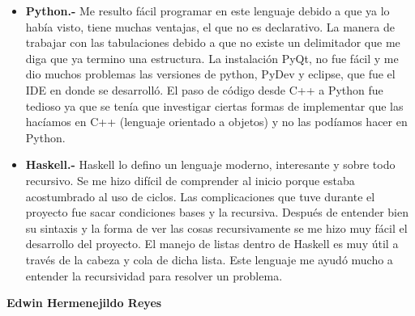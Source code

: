 \documentclass[10pt,oneside]{report}
\begin{document}
\begin{itemize}
	\item {\bf Python.-}  \textsf{ Me resulto fácil programar en este lenguaje debido a que ya lo había visto,  tiene muchas ventajas, el que no es declarativo. La manera de trabajar con las tabulaciones debido a que no existe un delimitador que me diga que ya termino una estructura. La instalación PyQt, no fue fácil y me dio muchos problemas las versiones de python, PyDev y eclipse, que fue el IDE en donde se desarrolló. El paso de código desde C++ a Python fue tedioso ya que se tenía que investigar ciertas formas de implementar que las hacíamos en C++ (lenguaje orientado a objetos) y no las podíamos hacer en Python.}
	\item {\bf Haskell.-}\textsf{ Haskell lo defino un lenguaje moderno, interesante y sobre todo recursivo. Se me hizo difícil de comprender al inicio porque estaba acostumbrado al uso de ciclos. Las complicaciones que tuve durante el proyecto fue sacar condiciones bases y la recursiva. Después de entender bien su sintaxis y la forma de ver las cosas recursivamente se me hizo muy fácil el desarrollo del proyecto. El manejo de listas dentro de Haskell es muy útil a través de la cabeza y cola de dicha lista. Este lenguaje me ayudó mucho a entender la recursividad para resolver un problema. } 
\end{itemize}\newpage
{\bf Edwin Hermenejildo Reyes \newline }
\end{document}

